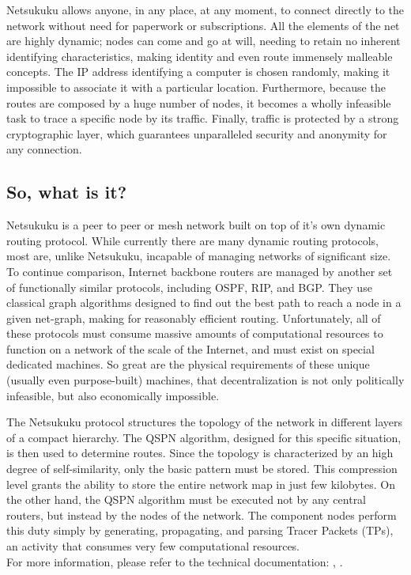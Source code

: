 \documentclass[a4paper]{article}
\begin{document}
Netsukuku allows anyone, in any place, at any moment, to connect directly to the network
without need for paperwork or subscriptions. 
All the elements of the net are highly dynamic; nodes can come and go at will, needing to
retain no inherent identifying characteristics, making identity and even route immensely
malleable concepts.  The IP address identifying a computer is chosen randomly, making it
impossible to associate it with a particular location.  Furthermore, because the routes 
are composed by a huge number of nodes, it becomes a wholly infeasible task to trace
a specific node by its traffic.  Finally, traffic is protected by a strong cryptographic
layer\cite{carciofo}, which guarantees unparalleled security and anonymity for any connection.

\subsection{So, what is it?}

Netsukuku is a peer to peer or mesh network built on top of it's own dynamic routing protocol.
While currently there are many dynamic routing protocols, most are, unlike Netsukuku, incapable
of managing networks of significant size.  To continue comparison, Internet backbone routers
are managed by another set of functionally similar protocols, including OSPF, RIP, and BGP.
They use classical graph algorithms designed to find out the best path to reach a node in a 
given net-graph, making for reasonably efficient routing.  Unfortunately, all of these 
protocols must consume massive amounts of computational resources to function on a network
of the scale of the Internet, and must exist on special dedicated machines. 
So great are the physical requirements of these unique (usually even purpose-built) machines,
that decentralization is not only politically infeasible, but also economically impossible.

The Netsukuku protocol structures the topology of the network in different
layers of a compact hierarchy\cite{ntktopology}. The  
QSPN\cite{qspndoc} algorithm, designed for this
specific situation, is then used to determine routes. Since the topology is
characterized by an high degree of self-similarity, only the basic pattern must be stored.
This compression level grants the ability to store the entire network map in
just few kilobytes. On the other hand, the QSPN algorithm must be executed not by 
any central routers, but instead by the nodes of the network.  The component nodes perform this 
duty simply by generating, propagating, and parsing Tracer Packets (TPs), an activity 
that consumes very few computational resources.\\
For more information, please refer to the technical
documentation: \cite{ntktopology}, \cite{qspndoc}.
\end{document}
